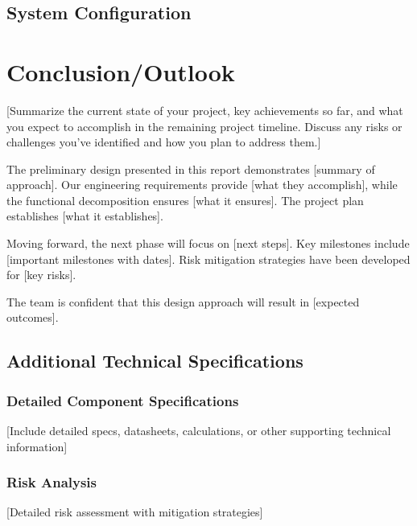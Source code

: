 \documentclass[final]{../designreport}
\newcommand{\conclusionoutlook}{\section{Conclusion/Outlook}}
\begin{document}
\subsection{System Configuration}


\conclusionoutlook
[Summarize the current state of your project, key achievements so far, and what you expect to accomplish in the remaining project timeline. Discuss any risks or challenges you've identified and how you plan to address them.]

The preliminary design presented in this report demonstrates [summary of approach]. Our engineering requirements provide [what they accomplish], while the functional decomposition ensures [what it ensures]. The project plan establishes [what it establishes].

Moving forward, the next phase will focus on [next steps]. Key milestones include [important milestones with dates]. Risk mitigation strategies have been developed for [key risks].

The team is confident that this design approach will result in [expected outcomes].

\printbibliography

\makeappendix

\subsection{Additional Technical Specifications}

\subsubsection{Detailed Component Specifications}
[Include detailed specs, datasheets, calculations, or other supporting technical information]

\subsubsection{Risk Analysis}
[Detailed risk assessment with mitigation strategies]
\end{document}
